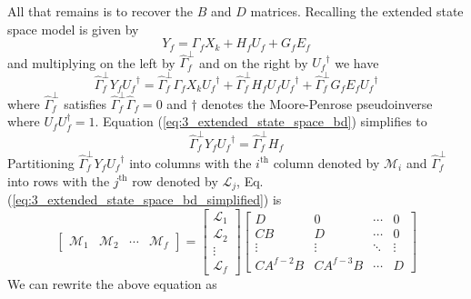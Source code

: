 All that remains is to recover the $B$ and $D$ matrices. Recalling the extended state space model is given by
\begin{equation*}
Y_f = \Gamma_f X_k + H_f U_f + G_f E_f
\end{equation*}
and multiplying on the left by $\hat{\Gamma}_f^\perp$ and on the right by ${U_f}^\dagger$ we have
\begin{equation}\label{eq:3_extended_state_space_bd}
\hat{\Gamma}_f^\perp Y_f {U_f}^\dagger = \hat{\Gamma}_f^\perp\Gamma_f X_k {U_f}^\dagger + \hat{\Gamma}_f^\perp H_f U_f {U_f}^\dagger + \hat{\Gamma}_f^\perp G_f E_f {U_f}^\dagger
\end{equation}
where $\hat{\Gamma}_f^\perp$ satisfies $\hat{\Gamma}_f^\perp\hat{\Gamma}_f = 0$ and $\dagger$ denotes the Moore-Penrose pseudoinverse where $U_f U_f^\dagger = 1$. Equation (\ref{eq:3_extended_state_space_bd}) simplifies to
\begin{equation}\label{eq:3_extended_state_space_bd_simplified}
\hat{\Gamma}_f^\perp Y_f {U_f}^\dagger = \hat{\Gamma}_f^\perp H_f 
\end{equation}
Partitioning $\hat{\Gamma}_f^\perp Y_f {U_f}^\dagger$ into columns with the $i^{\mbox{th}}$ column denoted by $\mathcal{M}_i$ and $\hat{\Gamma}_f^\perp$ into rows with the $j^{\mbox{th}}$ row denoted by $\mathcal{L}_j$, Eq. (\ref{eq:3_extended_state_space_bd_simplified}) is
\begin{equation*}
\begin{bmatrix}\mathcal{M}_1 & \mathcal{M}_2 & \cdots & \mathcal{M}_f\end{bmatrix} = 
\begin{bmatrix}\mathcal{L}_1\\ \mathcal{L}_2\\ \vdots\\ \mathcal{L}_f\end{bmatrix}
\begin{bmatrix}
D & 0 & \cdots & 0\\
CB & D & \cdots & 0\\
\vdots & \vdots  & \ddots & \vdots\\
CA^{f-2}B & CA^{f-3}B & \cdots & D
\end{bmatrix}
\end{equation*}
We can rewrite the above equation as
